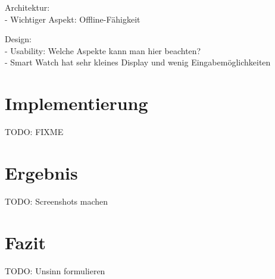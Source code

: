 Architektur:
\\- Wichtiger Aspekt: Offline-Fähigkeit

Design:
\\- Usability: Welche Aspekte kann man hier beachten?
\\- Smart Watch hat sehr kleines Display und wenig Eingabemöglichkeiten

\section{Implementierung}
TODO: FIXME

\section{Ergebnis}
TODO: Screenshots machen

\section{Fazit}
TODO: Unsinn formulieren


\appendix


\newpage

